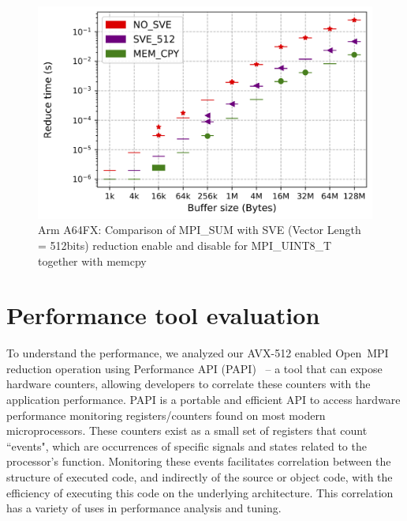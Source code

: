 \documentclass[5p,times,twocolumn]{elsarticle}
\newcommand{\ompi}[0]{Open~MPI\xspace}
\begin{document}
\begin{figure}[h]
    \centering
    \includegraphics[width=\linewidth]{sve512_extend_more_sum_u8_1k-128M.png}
    \caption{Arm A64FX: Comparison of MPI\_SUM with SVE (Vector Length = 512bits) reduction enable and disable for MPI\_UINT8\_T together with memcpy}
    \label{fig:armsum}
\end{figure}

\section{Performance tool evaluation}\label{sec:perf}
To understand the performance, we analyzed our AVX-512 enabled \ompi reduction
operation using Performance API (PAPI)~\cite{papi} -- a tool that can expose
hardware counters, allowing developers to correlate these counters
with the application performance.
PAPI is a portable and efficient API to access hardware performance
monitoring registers/counters found on most modern microprocessors.
These counters exist
as a small set of registers that count ``events", which are occurrences of specific signals
and states related to the processor's function. Monitoring these events facilitates
correlation between the structure of executed code, and indirectly of the source or object code, with the efficiency
of executing this code on the underlying architecture. This correlation has a variety of uses in
performance analysis and tuning.
\end{document}
